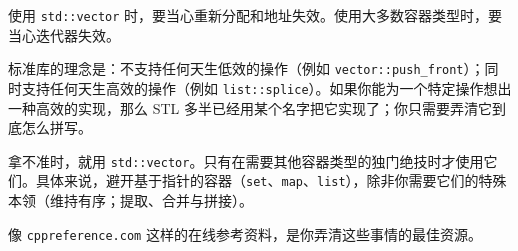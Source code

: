 使用 \texttt{std::\allowbreak{}vector} 时，要当心重新分配和地址失效。使用大多数容器类型时，要当心迭代器失效。

标准库的理念是：不支持任何天生低效的操作（例如 \texttt{vector::\allowbreak{}push\_\allowbreak{}front}）；同时支持任何天生高效的操作（例如 \texttt{list::\allowbreak{}splice}）。如果你能为一个特定操作想出一种高效的实现，那么 STL 多半已经用某个名字把它实现了；你只需要弄清它到底怎么拼写。

拿不准时，就用 \texttt{std::\allowbreak{}vector}。只有在需要其他容器类型的独门绝技时才使用它们。具体来说，避开基于指针的容器（\texttt{set}、\texttt{map}、\texttt{list}），除非你需要它们的特殊本领（维持有序；提取、合并与拼接）。

像 \texttt{cppreference.\allowbreak{}com} 这样的在线参考资料，是你弄清这些事情的最佳资源。
